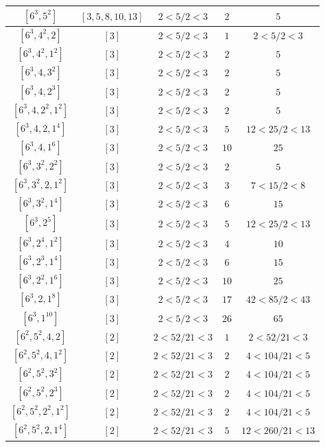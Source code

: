 \documentclass{article}%
\begin{document}
\begin{center}
\begin{longtable}{||c|c|c|c|c||}
$[6^{3}, 5^{2}]$ & $[3, 5, 8, 10, 13]$ & $2 < 5/2 < 3$ & $2$ & $5$ \\ \hline 
$[6^{3}, 4^{2}, 2]$ & $[3]$ & $2 < 5/2 < 3$ & $1$ & $2 < 5/2 < 3$ \\ \hline 
$[6^{3}, 4^{2}, 1^{2}]$ & $[3]$ & $2 < 5/2 < 3$ & $2$ & $5$ \\ \hline 
$[6^{3}, 4, 3^{2}]$ & $[3]$ & $2 < 5/2 < 3$ & $2$ & $5$ \\ \hline 
$[6^{3}, 4, 2^{3}]$ & $[3]$ & $2 < 5/2 < 3$ & $2$ & $5$ \\ \hline 
$[6^{3}, 4, 2^{2}, 1^{2}]$ & $[3]$ & $2 < 5/2 < 3$ & $2$ & $5$ \\ \hline 
$[6^{3}, 4, 2, 1^{4}]$ & $[3]$ & $2 < 5/2 < 3$ & $5$ & $12 < 25/2 < 13$ \\ \hline 
$[6^{3}, 4, 1^{6}]$ & $[3]$ & $2 < 5/2 < 3$ & $10$ & $25$ \\ \hline 
$[6^{3}, 3^{2}, 2^{2}]$ & $[3]$ & $2 < 5/2 < 3$ & $2$ & $5$ \\ \hline 
$[6^{3}, 3^{2}, 2, 1^{2}]$ & $[3]$ & $2 < 5/2 < 3$ & $3$ & $7 < 15/2 < 8$ \\ \hline 
$[6^{3}, 3^{2}, 1^{4}]$ & $[3]$ & $2 < 5/2 < 3$ & $6$ & $15$ \\ \hline 
$[6^{3}, 2^{5}]$ & $[3]$ & $2 < 5/2 < 3$ & $5$ & $12 < 25/2 < 13$ \\ \hline 
$[6^{3}, 2^{4}, 1^{2}]$ & $[3]$ & $2 < 5/2 < 3$ & $4$ & $10$ \\ \hline 
$[6^{3}, 2^{3}, 1^{4}]$ & $[3]$ & $2 < 5/2 < 3$ & $6$ & $15$ \\ \hline 
$[6^{3}, 2^{2}, 1^{6}]$ & $[3]$ & $2 < 5/2 < 3$ & $10$ & $25$ \\ \hline 
$[6^{3}, 2, 1^{8}]$ & $[3]$ & $2 < 5/2 < 3$ & $17$ & $42 < 85/2 < 43$ \\ \hline 
$[6^{3}, 1^{10}]$ & $[3]$ & $2 < 5/2 < 3$ & $26$ & $65$ \\ \hline 
$[6^{2}, 5^{2}, 4, 2]$ & $[2]$ & $2 < 52/21 < 3$ & $1$ & $2 < 52/21 < 3$ \\ \hline 
$[6^{2}, 5^{2}, 4, 1^{2}]$ & $[2]$ & $2 < 52/21 < 3$ & $2$ & $4 < 104/21 < 5$ \\ \hline 
$[6^{2}, 5^{2}, 3^{2}]$ & $[2]$ & $2 < 52/21 < 3$ & $2$ & $4 < 104/21 < 5$ \\ \hline 
$[6^{2}, 5^{2}, 2^{3}]$ & $[2]$ & $2 < 52/21 < 3$ & $2$ & $4 < 104/21 < 5$ \\ \hline 
$[6^{2}, 5^{2}, 2^{2}, 1^{2}]$ & $[2]$ & $2 < 52/21 < 3$ & $2$ & $4 < 104/21 < 5$ \\ \hline 
$[6^{2}, 5^{2}, 2, 1^{4}]$ & $[2]$ & $2 < 52/21 < 3$ & $5$ & $12 < 260/21 < 13$ \\ \hline 

\end{longtable}
\end{center}
\end{document}
